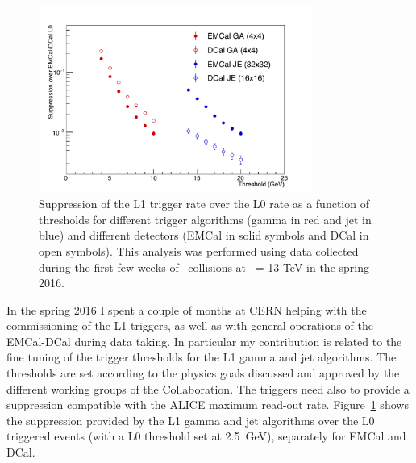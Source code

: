 \documentclass[12pt, a4paper, twoside, titlepage]{article}
\begin{document}
\begin{figure}[tb]
\begin{center}
\includegraphics[width=0.8\textwidth]{img/EMCalTriggerSuppression}
 \caption{Suppression of the L1 trigger rate over the L0 rate as a function of thresholds for different trigger algorithms (gamma in red and jet in blue) 
 and different detectors (EMCal in solid symbols and DCal in open symbols). This analysis was performed using data collected during the first few weeks of
 \pp\ collisions at \s\ = 13 TeV in the spring 2016.} 
 \label{fig:EMCalTriggerSuppression}
\end{center}
\end{figure}
In the spring 2016 I spent a couple of months at CERN helping with the commissioning of the L1 triggers, as well as with general operations of the EMCal-DCal during data taking.
In particular my contribution is related to the fine tuning of the trigger thresholds for the L1 gamma and jet algorithms. The thresholds are set according to the physics goals discussed
and approved by the different working groups of the Collaboration. The triggers need also to provide a suppression compatible with the ALICE maximum read-out rate.
Figure~\ref{fig:EMCalTriggerSuppression} shows the suppression provided by the L1 gamma and jet algorithms over the L0 triggered events (with a L0 threshold set at 2.5~GeV), separately for EMCal and DCal.

{}

\end{document}
